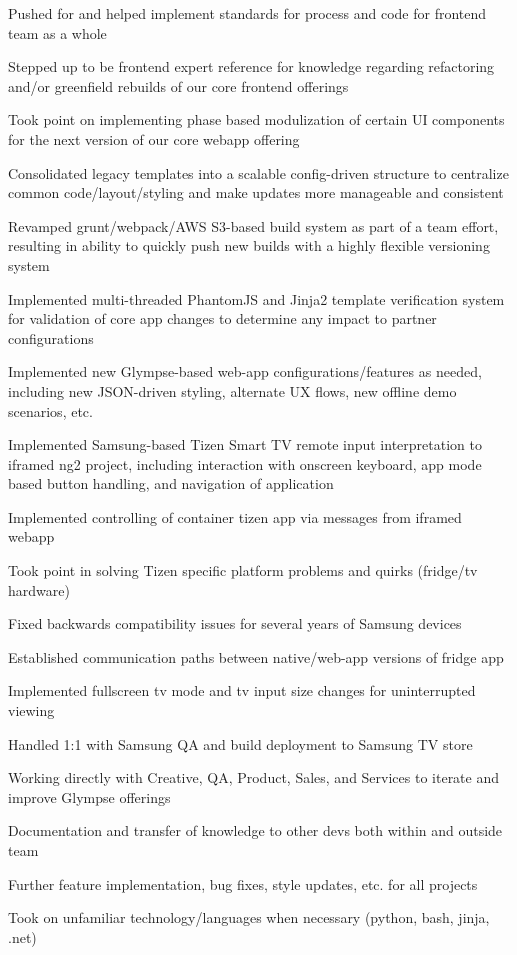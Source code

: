 \begin{cventries}
{\begin{cvitems}
        \item {Pushed for and helped implement standards for process and code for frontend team as a whole}
        \item {Stepped up to be frontend expert reference for knowledge regarding refactoring and/or greenfield rebuilds of our core frontend offerings}
        \item {Took point on implementing phase based modulization of certain UI components for the next version of our core webapp offering}
        \item {Consolidated legacy templates into a scalable config-driven structure to centralize common code/layout/styling and make updates more manageable and consistent}
        \item {Revamped grunt/webpack/AWS S3-based build system as part of a team effort, resulting in ability to quickly push new builds with a highly flexible versioning system}
        \item {Implemented multi-threaded PhantomJS and Jinja2 template verification system for validation of core app changes to determine any impact to partner configurations}
        \item {Implemented new Glympse-based web-app configurations/features as needed, including new JSON-driven styling, alternate UX flows, new offline demo scenarios, etc.}
        \item {Implemented Samsung-based Tizen Smart TV remote input interpretation to iframed ng2 project, including interaction with onscreen keyboard, app mode based button handling, and navigation of application}
        \item {Implemented controlling of container tizen app via messages from iframed webapp}
        \item {Took point in solving Tizen specific platform problems and quirks (fridge/tv hardware)}
        \item {Fixed backwards compatibility issues for several years of Samsung devices}
        \item {Established communication paths between native/web-app versions of fridge app}
        \item {Implemented fullscreen tv mode and tv input size changes for uninterrupted viewing}
        \item {Handled 1:1 with Samsung QA and build deployment to Samsung TV store}
        \item {Working directly with Creative, QA, Product, Sales, and Services to iterate and improve Glympse offerings}
        \item {Documentation and transfer of knowledge to other devs both within and outside team}
        \item {Further feature implementation, bug fixes, style updates, etc. for all projects}
        \item {Took on unfamiliar technology/languages when necessary (python, bash, jinja, .net)}
      \end{cvitems}
    }


\end{cventries}
